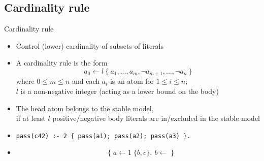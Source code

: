 \subsection{Cardinality rule}
\begin{frame}[fragile]{Cardinality rule}
  \label{eqn:cardinality:rule}
  \begin{itemize}
  \item {}
    Control (lower) cardinality of subsets of literals
  \item {}
    A \alert{cardinality rule} is the form
    \[
    a_0\leftarrow l~\{\ a_1,\dots,a_m,\neg a_{m+1},\dots,\neg a_n\ \}
    \]
    where $0\leq m\leq n$ and each $a_i$ is an atom for $1\leq i\leq n$;\\
    $l$ is a non-negative integer (acting as a \alert{lower bound} on the body)
    \smallskip
  \item<2-> 
    The head atom belongs to the stable model,\\
    if at least $l$ positive/negative body literals are in/excluded in the stable model
    \medskip
  \item<3-> 
\begin{lstlisting}[basicstyle=\ttfamily\small]
pass(c42) :- 2 { pass(a1); pass(a2); pass(a3) }.
\end{lstlisting}
  \item<4-> 
    \begin{align*}
      & \{\;a\leftarrow 1\;\{b,c\},\ b\leftarrow\;\}
    \end{align*}
  \end{itemize}
\end{frame}
